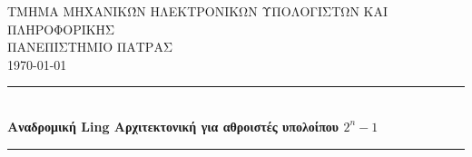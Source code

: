 
\begin{titlepage} %
	\newcommand{\HRule}{\rule{\linewidth}{0.5mm}} %
	
	\center %
	
	
	\textsc{\LARGE ΤΜΗΜΑ ΜΗΧΑΝΙΚΏΝ ΗΛΕΚΤΡΟΝΙΚΩΝ ΥΠΟΛΟΓΙΣΤΩΝ ΚΑΙ ΠΛΗΡΟΦΟΡΙΚΗΣ}\\[1.5cm]
	\textsc{\Large ΠΑΝΕΠΙΣΤΗΜΙΟ ΠΑΤΡΑΣ}\\[0.8cm] 
	\textsc{\large \today}\\[1cm]
	
	
	\HRule\\[0.4cm]
	{\huge\bfseries Αναδρομική Ling Αρχιτεκτονική για αθροιστές υπολοίπου $2^n-1$}\\[0.4cm] 
	\HRule\\[1.5cm]
	


\end{titlepage}
